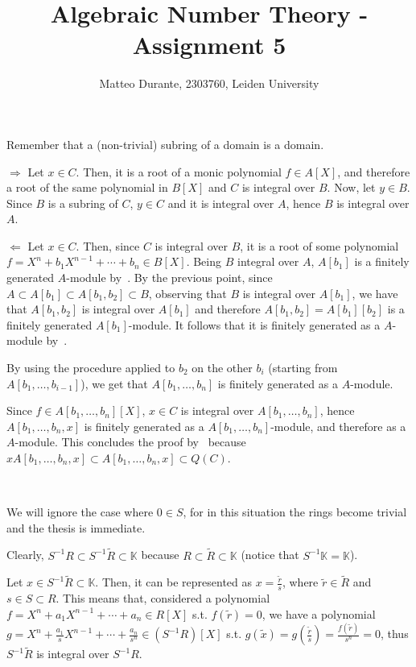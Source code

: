 \documentclass{article}
\newcommand{\numberset}{\mathbb}
\newcommand{\K}{\numberset{K}}
\newcommand{\exercise}[1]{\noindent {\bf Exercise #1}}
\begin{document}
\title{Algebraic Number Theory - Assignment 5}

\author{Matteo Durante, 2303760, Leiden University}

\maketitle


\exercise{21}

Remember that a (non-trivial) subring of a domain is a domain.

$\Rightarrow$ Let $x\in C$. Then, it is a root of a monic polynomial $f\in A[X]$, and therefore a root of the same polynomial in $B[X]$ and $C$ is integral over $B$. Now, let $y\in B$. Since $B$ is a subring of $C$, $y\in C$ and it is integral over $A$, hence $B$ is integral over $A$.

$\Leftarrow$ Let $x\in C$. Then, since $C$ is integral over $B$, it is a root of some polynomial $f=X^n+b_1X^{n-1}+\cdots+b_n\in B[X]$. Being $B$ integral over $A$, $A[b_1]$ is a finitely generated $A$-module by~\cite[lemma 3.16]{stev}. By the previous point, since $A\subset A[b_1]\subset A[b_1,b_2]\subset B$, observing that $B$ is integral over $A[b_1]$, we have that $A[b_1,b_2]$ is integral over $A[b_1]$ and therefore $A[b_1,b_2]=A[b_1][b_2]$ is a finitely generated $A[b_1]$-module. It follows that it is finitely generated as a $A$-module by~\cite[prop. 2.16]{atm}.

By using the procedure applied to $b_2$ on the other $b_i$ (starting from $A[b_1,\ldots,b_{i-1}]$), we get that $A[b_1,\ldots,b_n]$ is finitely generated as a $A$-module.

Since $f\in A[b_1,\ldots,b_n][X]$, $x\in C$ is integral over $A[b_1,\ldots,b_n]$, hence $A[b_1,\ldots,b_n,x]$ is finitely generated as a $A[b_1,\ldots,b_n]$-module, and therefore as a $A$-module. This concludes the proof by~\cite[lemma 3.16]{stev} because $xA[b_1,\ldots,b_n,x]\subset A[b_1,\ldots,b_n,x]\subset Q(C)$.


~\\
\exercise{22}

We will ignore the case where $0\in S$, for in this situation the rings become trivial and the thesis is immediate.

Clearly, $S^{-1}R\subset S^{-1}\tilde{R}\subset\K$ because $R\subset\tilde{R}\subset\K$ (notice that $S^{-1}\K=\K$).

Let $x\in S^{-1}\tilde{R}\subset\K$. Then, it can be represented as $x=\frac{\tilde{r}}{s}$, where $\tilde{r}\in\tilde{R}$ and $s\in S\subset R$. This means that, considered a polynomial $f=X^n+a_1X^{n-1}+\cdots+a_n\in R[X]$ s.t. $f(\tilde{r})=0$, we have a polynomial $g=X^n+\frac{a_1}{s}X^{n-1}+\cdots+\frac{a_n}{s^n}\in (S^{-1}R)[X]$ s.t. $g(\tilde{x})=g(\frac{\tilde{r}}{s})=\frac{f(\tilde{r})}{s^n}=0$, thus $S^{-1}\tilde{R}$ is integral over $S^{-1}R$.
\end{document}
